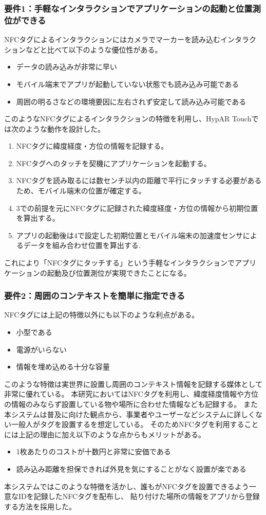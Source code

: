 \subsubsection*{要件1：手軽なインタラクションでアプリケーションの起動と位置測位ができる}
NFCタグによるインタラクションにはカメラでマーカーを読み込むインタラクションなどと比べて以下のような優位性がある。
\begin{itemize}
  \item データの読み込みが非常に早い
  \item モバイル端末でアプリが起動していない状態でも読み込み可能である
  \item 周囲の明るさなどの環境要因に左右されず安定して読み込み可能である
\end{itemize}
このようなNFCタグによるインタラクションの特徴を利用し、HypAR Touchでは次のような動作を設計した。
\begin{enumerate}
  \item NFCタグに緯度経度・方位の情報を記録する。
  \item NFCタグへのタッチを契機にアプリケーションを起動する。
  \item NFCタグを読み取るには数センチ以内の距離で平行にタッチする必要があるため、モバイル端末の位置が確定する。
  \item 3での前提を元にNFCタグに記録された緯度経度・方位の情報から初期位置を算出する。
  \item アプリの起動後は4で設定した初期位置とモバイル端末の加速度センサによるデータを組み合わせ位置を算出する.
\end{enumerate}
これにより「NFCタグにタッチする」という手軽なインタラクションでアプリケーションの起動及び位置測位が実現できたことになる。

\subsubsection*{要件2：周囲のコンテキストを簡単に指定できる}
NFCタグには上記の特徴以外にも以下のような利点がある。
\begin{itemize}
  \item 小型である
  \item 電源がいらない
  \item 情報を埋め込める十分な容量
\end{itemize}
このような特徴は実世界に設置し周囲のコンテキスト情報を記録する媒体として非常に優れている。
本研究においてはNFCタグを利用し、緯度経度情報や方位の情報のみならず設置している物や場所に合わせた情報なども記録する。
また本システムは普及に向けた観点から、事業者やユーザーなどシステムに詳しくない一般人がタグを設置するを想定している。
そのためNFCタグを利用することには上記の理由に加え以下のような点からもメリットがある。
\begin{itemize}
  \item 1枚あたりのコストが十数円と非常に安価である
  \item 読み込み距離を担保できれば外見を気にすることがなく設置が楽である
\end{itemize}
本システムではこのような特徴を活かし、誰もがNFCタグを設置できるよう一意なIDを記録したNFCタグを配布し、
貼り付けた場所の情報をアプリから登録する方法を採用した。


